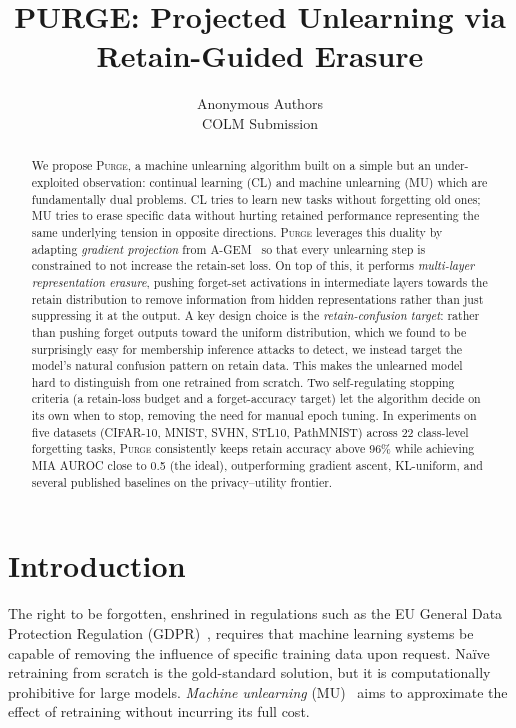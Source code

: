 \documentclass[10pt,twocolumn]{article}
\title{\textbf{PURGE: Projected Unlearning via Retain-Guided Erasure}}
\author{
Anonymous Authors \\
COLM Submission
}
\date{}
\newcommand{\ours}{\textsc{Purge}}
\begin{document}
\maketitle

\begin{abstract}
We propose \ours{}, a machine unlearning algorithm built on a simple but an under-exploited observation: continual learning (CL) and machine unlearning (MU) which are fundamentally dual problems. CL tries to learn new tasks without forgetting old ones; MU tries to erase specific data without hurting retained performance representing the same underlying tension in opposite directions.
\ours{} leverages this duality by adapting \emph{gradient projection} from A-GEM~\cite{chaudhry2019agem} so that every unlearning step is constrained to not increase the retain-set loss.
On top of this, it performs \emph{multi-layer representation erasure}, pushing forget-set activations in intermediate layers towards the retain distribution to remove information from hidden representations rather than just suppressing it at the output.
A key design choice is the \emph{retain-confusion target}: rather than pushing forget outputs toward the uniform distribution, which we found to be surprisingly easy for membership inference attacks to detect, we instead target the model's natural confusion pattern on retain data.
This makes the unlearned model hard to distinguish from one retrained from scratch.
Two self-regulating stopping criteria (a retain-loss budget and a forget-accuracy target) let the algorithm decide on its own when to stop, removing the need for manual epoch tuning.
In experiments on five datasets (CIFAR-10, MNIST, SVHN, STL10, PathMNIST) across 22 class-level forgetting tasks, \ours{} consistently keeps retain accuracy above 96\% while achieving MIA AUROC close to 0.5 (the ideal), outperforming gradient ascent, KL-uniform, and several published baselines on the privacy--utility frontier.
\end{abstract}

\section{Introduction}\label{sec:intro}

The right to be forgotten, enshrined in regulations such as the EU General Data Protection Regulation (GDPR)~\cite{voigt2017gdpr}, requires that machine learning systems be capable of removing the influence of specific training data upon request.
Na\"ive retraining from scratch is the gold-standard solution, but it is computationally prohibitive for large models.
\emph{Machine unlearning} (MU)~\cite{bourtoule2021sisa} aims to approximate the effect of retraining without incurring its full cost.
\end{document}
